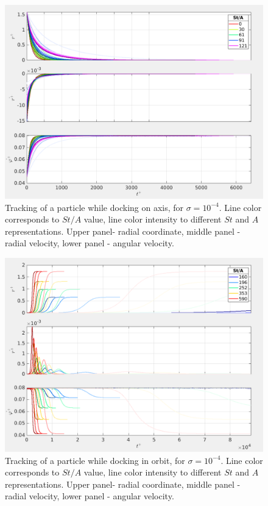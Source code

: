 \documentclass[../main.tex]{subfiles}
\begin{document}
\begin{figure}
\centering
\noindent \includegraphics[width=30pc]{gfx/point_docking_vel_traj_in_time_noscal.png}
\caption{Tracking of a particle while docking on axis, for  $\sigma=10^{-4}$. Line color corresponds to $St/A$ value, line color intensity to different $St$ and $A$ representations. Upper panel- radial coordinate, middle panel - radial velocity, lower panel - angular velocity.}
\label{fig:ch3_42}
\end{figure}

\begin{figure}
\centering
\noindent \includegraphics[width=30pc]{gfx/orbit_docking_vel_traj_in_time_noscal.png}
\caption{Tracking of a particle while docking in orbit, for $\sigma=10^{-4}$. Line color corresponds to $St/A$ value, line color intensity to different $St$ and $A$ representations. Upper panel- radial coordinate, middle panel - radial velocity, lower panel - angular velocity.}
\label{fig:ch3_41}
\end{figure}
\end{document}
